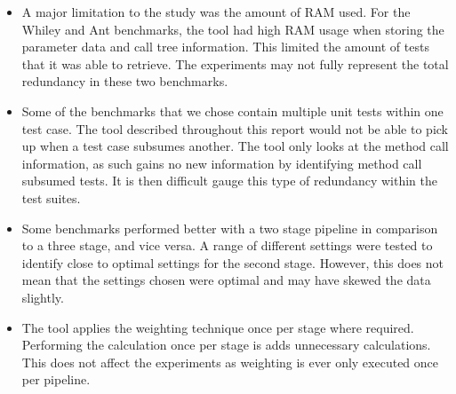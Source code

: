 \begin{itemize}

\item A major limitation to the study was the amount of RAM used. For the Whiley and Ant benchmarks, the tool had high RAM usage when storing the parameter data and call tree information. This limited the amount of tests that it was able to retrieve. The experiments may not fully represent the total redundancy in these two benchmarks.

\item Some of the benchmarks that we chose contain multiple unit tests within one test case. The tool described throughout this report would not be able to pick up when a test case subsumes another. The tool only looks at the method call information, as such gains no new information by identifying method call subsumed tests. It is then difficult gauge this type of redundancy within the test suites.

\item Some benchmarks performed better with a two stage pipeline in comparison to a three stage, and vice versa. A range of different settings were tested to identify close to optimal settings for the second stage. However, this does not mean that the settings chosen were optimal and may have skewed the data slightly.

\item The tool applies the weighting technique once per stage where required. Performing the calculation once per stage is adds unnecessary calculations. This does not affect the experiments as weighting is ever only executed once per pipeline.
\end{itemize}
